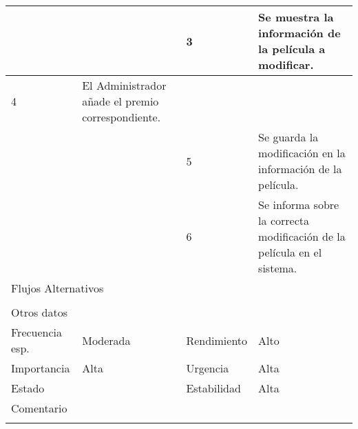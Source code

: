\documentclass{article}
\begin{document}
\begin{table}[h]
\begin{tabular}{|l|l|l|l|l|l|}
\hline
\multicolumn{1}{|p{1cm}|}{} & \multicolumn{2}{p{3cm}}{} & \multicolumn{1}{|p{1cm}|}{3} & \multicolumn{2}{p{3cm}|}{Se muestra la información de la película a modificar.}\\
\hline
\multicolumn{1}{|p{1cm}|}{4} & \multicolumn{2}{p{3cm}}{El Administrador añade el premio correspondiente.} & \multicolumn{1}{|p{1cm}|}{} & \multicolumn{2}{p{3cm}|}{}\\
\hline
\multicolumn{1}{|p{1cm}|}{} & \multicolumn{2}{p{3cm}}{} & \multicolumn{1}{|p{1cm}|}{5} & \multicolumn{2}{p{3cm}|}{Se guarda la modificación en la información de la película.}\\
\hline
\multicolumn{1}{|p{1cm}|}{} & \multicolumn{2}{p{3cm}}{} & \multicolumn{1}{|p{1cm}|}{6} & \multicolumn{2}{p{3cm}|}{Se informa sobre la correcta modificación de la película en el sistema.}\\
\hline
\multicolumn{6}{|p{10cm}|}{Flujos Alternativos}\\
\hline
\multicolumn{1}{|p{1cm}}{} & \multicolumn{5}{|p{9cm}|}{}\\
\hline
\multicolumn{6}{|p{10cm}|}{Otros datos}\\
\hline
\multicolumn{1}{|p{2cm}|}{Frecuencia esp.} & \multicolumn{2}{p{3cm}}{Moderada} & \multicolumn{1}{|p{2cm}|}{Rendimiento} & \multicolumn{2}{p{3cm}|}{Alto}\\
\hline
\multicolumn{1}{|p{2cm}|}{Importancia} & \multicolumn{2}{p{3cm}}{Alta} & \multicolumn{1}{|p{2cm}|}{Urgencia} & \multicolumn{2}{p{3cm}|}{Alta}\\
\hline
\multicolumn{1}{|p{2cm}|}{Estado} & \multicolumn{2}{p{3cm}}{} & \multicolumn{1}{|p{2cm}|}{Estabilidad} & \multicolumn{2}{p{3cm}|}{Alta}\\
\hline
\multicolumn{6}{|p{10cm}|}{Comentario}\\
\hline
\multicolumn{6}{|p{10cm}|}{}\\
\hline
\end{tabular}
\end{table}
\addtocounter{ni}{1}
\end{document}
